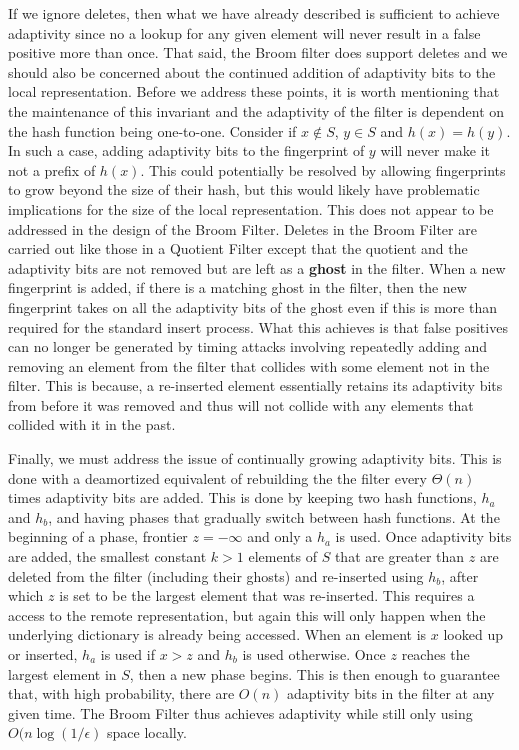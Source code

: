 \documentclass[../paper.tex]{subfiles}
\begin{document}
     If we ignore deletes, then what we have already described is sufficient to
     achieve adaptivity since no a lookup for any given element will never
     result in a false positive more than once.  That said, the Broom filter
     does support deletes and we should also be concerned about the continued
     addition of adaptivity bits to the local representation.  Before we
     address these points, it is worth mentioning that the maintenance of this
     invariant and the adaptivity of the filter is dependent on the hash
     function being one-to-one.  Consider if $x \notin S$, $y \in S$ and  $h(x)
     = h(y)$.  In such a case, adding adaptivity bits to the fingerprint of $y$
     will never make it not a prefix of $h(x)$.  This could potentially be
     resolved by allowing fingerprints to grow beyond the size of their hash,
     but this would likely have problematic implications for the size of the
     local representation.  This does not appear to be addressed in the design
     of the Broom Filter.  Deletes in the Broom Filter are carried out like
     those in a Quotient Filter except that the quotient and the adaptivity
     bits are not removed but are left as a {\bf ghost} in the filter.  When a
     new fingerprint is added, if there is a matching ghost in the filter, then
     the new fingerprint takes on all the adaptivity bits of the ghost even  if
     this is more than required for the standard insert process.  What this
     achieves is that false positives can no longer be generated by timing
     attacks involving repeatedly adding and removing an element from the
     filter that collides with some element not in the filter.  This is
     because, a re-inserted element essentially retains its adaptivity bits
     from before it was removed and thus will not collide with any elements
     that collided with it in the past.   
	 
     Finally, we must address the issue of continually growing adaptivity bits.
     This is done with a deamortized equivalent of rebuilding the the filter
     every $\Theta (n)$ times adaptivity bits are added.  This is done by
     keeping two hash functions, $h_a$ and $h_b$, and having phases that
     gradually switch between hash functions.  At the beginning of a phase,
     frontier $z = -\infty$ and only a $h_a$ is used.  Once adaptivity bits are
     added, the smallest constant $k > 1$ elements of $S$ that are greater than
     $z$ are deleted from the filter (including their ghosts) and re-inserted
     using $h_b$, after which $z$ is set to be the largest element that was
     re-inserted.  This requires a access to the remote representation, but
     again this will only happen when the underlying dictionary is already
     being accessed.  When an element is $x$ looked up or inserted, $h_a$ is
     used if $x > z$ and $h_b$ is used otherwise.  Once $z$ reaches the largest
     element in $S$, then a new phase begins.  This is then enough to guarantee
     that, with high probability, there are $O(n)$ adaptivity bits in the
     filter at any given time.  The Broom Filter thus achieves adaptivity while
     still only using $O(n \log (1/\epsilon)$ space locally.  
\end{document}
